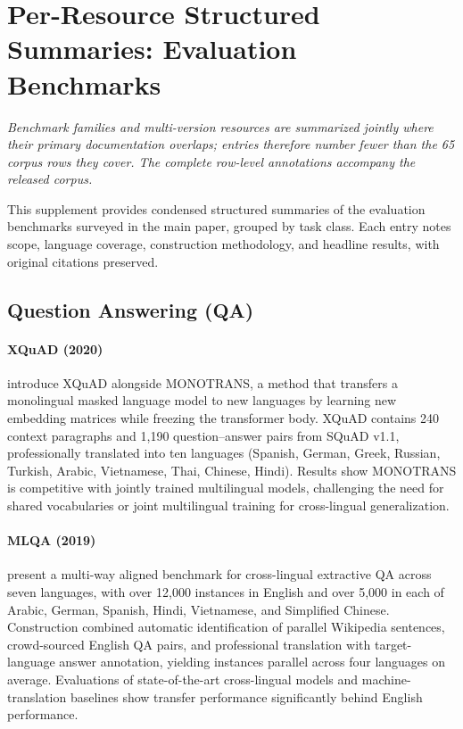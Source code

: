\documentclass[letterpaper]{article}
\begin{document}
\section{Per-Resource Structured Summaries: Evaluation Benchmarks}
\emph{Benchmark families and multi-version resources are summarized jointly where their primary documentation overlaps; entries therefore number fewer than the 65 corpus rows they cover. The complete row-level annotations accompany the released corpus.}

This supplement provides condensed structured summaries of the evaluation benchmarks surveyed in the main paper, grouped by task class. Each entry notes scope, language coverage, construction methodology, and headline results, with original citations preserved.

\subsection{Question Answering (QA)}

\paragraph{XQuAD (2020)} \citet{Artetxe_2020} introduce XQuAD alongside MONOTRANS, a method that transfers a monolingual masked language model to new languages by learning new embedding matrices while freezing the transformer body. XQuAD contains 240 context paragraphs and 1,190 question--answer pairs from SQuAD v1.1, professionally translated into ten languages (Spanish, German, Greek, Russian, Turkish, Arabic, Vietnamese, Thai, Chinese, Hindi). Results show MONOTRANS is competitive with jointly trained multilingual models, challenging the need for shared vocabularies or joint multilingual training for cross-lingual generalization.

\paragraph{MLQA (2019)} \citet{lewis2019mlqa} present a multi-way aligned benchmark for cross-lingual extractive QA across seven languages, with over 12,000 instances in English and over 5,000 in each of Arabic, German, Spanish, Hindi, Vietnamese, and Simplified Chinese. Construction combined automatic identification of parallel Wikipedia sentences, crowd-sourced English QA pairs, and professional translation with target-language answer annotation, yielding instances parallel across four languages on average. Evaluations of state-of-the-art cross-lingual models and machine-translation baselines show transfer performance significantly behind English performance.
\end{document}
